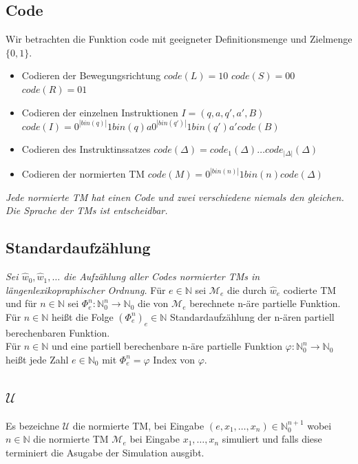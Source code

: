 \documentclass[DIV=15]{scrartcl}
\begin{document}
    \subsection{Code}
        Wir betrachten die Funktion code mit geeigneter Definitionsmenge und Zielmenge \(\{0,1\}\).
        \begin{itemize}
            \item Codieren der Bewegungsrichtung
                \subitem \(code(L)=10\)
                \subitem \(code(S)=00\)
                \subitem \(code(R)=01\)
            \item Codieren der einzelnen Instruktionen
                \subitem \(I=(q,a,q',a',B)\)
                \subitem \(code(I)=0^{|bin(q)|}1bin(q)a0^{|bin(q')|}1bin(q')a'code(B)\)
            \item Codieren des Instruktinssatzes 
                \subitem \(code(\Delta)=code_1(\Delta)\dots code_{|\Delta|}(\Delta)\)
            \item Codieren der normierten TM 
                \subitem \(code(M)=0^{|bin(n)|}1bin(n)code(\Delta)\)    
        \end{itemize}
        \textit{Jede normierte TM hat einen Code und zwei verschiedene niemals den gleichen. Die Sprache der TMs ist entscheidbar.}   
    \subsection{Standardaufzählung}
        \textit{Sei \(\hat{w}_0,\hat{w}_1,\dots\) die Aufzählung aller Codes normierter TMs in längenlexikopraphischer Ordnung.}\bigskip
        Für \(e\in\mathbb{N}\) sei \(\mathcal{M}_e\) die durch \(\hat{w}_e\) codierte TM und für \(n\in\mathbb{N}\) sei \(\Phi_e^n:\mathbb{N}_0^n\to\mathbb{N}_0\)
        die von \(\mathcal{M}_e\) berechnete n-äre partielle Funktion.\\
        Für \(n\in\mathbb{N}\) heißt die Folge \((\Phi_e^n)_e\in\mathbb{N}\) Standardaufzählung der n-ären partiell berechenbaren Funktion.\\
        Für \(n\in\mathbb{N}\) und eine partiell berechenbare n-äre partielle Funktion \(\varphi:\mathbb{N}_0^n\to\mathbb{N}_0\) heißt jede Zahl 
        \(e\in\mathbb{N}_0\) mit \(\Phi_e^n=\varphi\) Index von \(\varphi\).
    \subsection{\(\mathcal{U}\)}
        Es bezeichne \(\mathcal{U}\) die normierte TM, bei Eingabe \((e,x_1,\dots,x_n)\in\mathbb{N}_0^{n+1}\) wobei \(n\in\mathbb{N}\) die normierte TM \(\mathcal{M}_e\)
        bei Eingabe \(x_1,\dots,x_n\) simuliert und falls diese terminiert die Asugabe der Simulation ausgibt.
\end{document}

